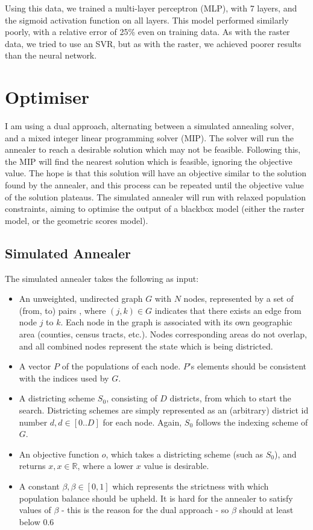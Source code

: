 \documentclass{article}
\begin{document}
Using this data, we trained a multi-layer perceptron (MLP), with 7 layers, and
the sigmoid activation function on all layers. This model performed similarly
poorly, with a relative error of 25\% even on training data. As with the raster
data, we tried to use an SVR, but as with the raster, we achieved poorer
results than the neural network.

\section{Optimiser}
I am using a dual approach, alternating between a simulated annealing solver,
and a mixed integer linear programming solver (MIP). The solver will run the
annealer to reach a desirable solution which may not be feasible. Following
this, the MIP will find the nearest solution which is feasible, ignoring the
objective value. The hope is that this solution will have an objective similar
to the solution found by the annealer, and this process can be repeated until
the objective value of the solution plateaus. The simulated annealer will run
with relaxed population constraints, aiming to optimise the output of a
blackbox model (either the raster model, or the geometric scores model).

\subsection{Simulated Annealer}
The simulated annealer takes the following as input:
\begin{itemize}
	\item An unweighted, undirected graph $G$ with $N$ nodes, represented by a set of
	      (from, to) pairs , where $(j,k)\in G$ indicates that there exists an edge from
	      node $j$ to $k$. Each node in the graph is associated with its own geographic
	      area (counties, census tracts, etc.). Nodes corresponding areas do not overlap,
	      and all combined nodes represent the state which is being districted.
	\item A vector $P$ of the populations of each node. $P$'s elements should be
	      consistent with the indices used by $G$.
	\item A districting scheme $S_0$, consisting of $D$ districts, from which to start
	      the search. Districting schemes are simply represented as an (arbitrary)
	      district id number $d, d\in[0..D]$ for each node. Again, $S_0$ follows the
	      indexing scheme of $G$.
	\item An objective function $o$, which takes a districting scheme (such as $S_0$),
	      and returns $x, x\in\mathbb{R}$, where a lower $x$ value is desirable.
	\item A constant $\beta, \beta\in[0, 1]$ which represents the strictness with which
	      population balance should be upheld. It is hard for the annealer to satisfy
	      values of $\beta$ - this is the reason for the dual approach - so $\beta$
	      should at least below $0.6$
\end{itemize}
\end{document}
